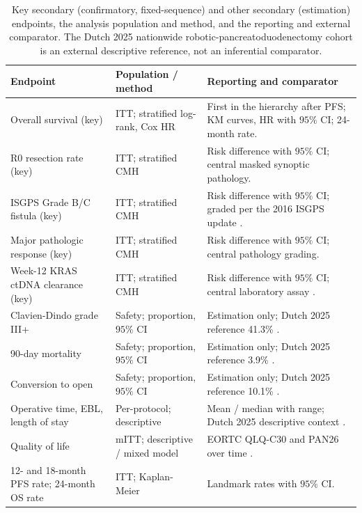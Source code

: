 \begin{table}[htbp]
\centering
\footnotesize
\caption{Key secondary (confirmatory, fixed-sequence) and other secondary
(estimation) endpoints, the analysis population and method, and the reporting and
external comparator. The Dutch 2025 nationwide robotic-pancreatoduodenectomy cohort
is an external descriptive reference, not an inferential comparator.}
\label{tab:secendpts}
\begin{tabularx}{\textwidth}{L{4.5cm} L{3.4cm} Y}
\toprule
\textbf{Endpoint} & \textbf{Population / method} & \textbf{Reporting and comparator} \\
\midrule
Overall survival (key) & ITT; stratified log-rank, Cox HR & First in the hierarchy after PFS; KM curves, HR with $95\%$ CI; 24-month rate. \\
R0 resection rate (key) & ITT; stratified CMH & Risk difference with $95\%$ CI; central masked synoptic pathology. \\
ISGPS Grade B/C fistula (key) & ITT; stratified CMH & Risk difference with $95\%$ CI; graded per the 2016 ISGPS update \cite{Bassi2017}. \\
Major pathologic response (key) & ITT; stratified CMH & Risk difference with $95\%$ CI; central pathology grading. \\
Week-12 KRAS ctDNA clearance (key) & ITT; stratified CMH & Risk difference with $95\%$ CI; central laboratory assay \cite{Tie2019ctdna}. \\
Clavien-Dindo grade III+ & Safety; proportion, $95\%$ CI & Estimation only; Dutch 2025 reference 41.3\% \cite{DutchCohort2025}. \\
90-day mortality & Safety; proportion, $95\%$ CI & Estimation only; Dutch 2025 reference 3.9\% \cite{DutchCohort2025}. \\
Conversion to open & Safety; proportion, $95\%$ CI & Estimation only; Dutch 2025 reference 10.1\% \cite{DutchCohort2025}. \\
Operative time, EBL, length of stay & Per-protocol; descriptive & Mean / median with range; Dutch 2025 descriptive context \cite{DutchCohort2025}. \\
Quality of life & mITT; descriptive / mixed model & EORTC QLQ-C30 and PAN26 over time \cite{EORTCqlqc30}. \\
12- and 18-month PFS rate; 24-month OS rate & ITT; Kaplan-Meier & Landmark rates with $95\%$ CI. \\
\bottomrule
\end{tabularx}
\end{table}

